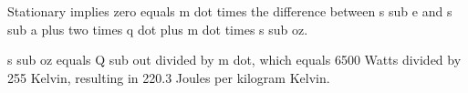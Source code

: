 Stationary implies zero equals m dot times the difference between s sub e and s sub a plus two times q dot plus m dot times s sub oz. 

s sub oz equals Q sub out divided by m dot, which equals 6500 Watts divided by 255 Kelvin, resulting in 220.3 Joules per kilogram Kelvin.